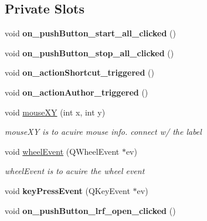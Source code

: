 \subsection*{Private Slots}
\begin{DoxyCompactItemize}
\item 
\hypertarget{class_main_window_a51927fde27346887663f8b1c8f83f5ab}{}void {\bfseries on\+\_\+push\+Button\+\_\+start\+\_\+all\+\_\+clicked} ()\label{class_main_window_a51927fde27346887663f8b1c8f83f5ab}

\item 
\hypertarget{class_main_window_a6b690c4d5c729e417ccc16fd730c452c}{}void {\bfseries on\+\_\+push\+Button\+\_\+stop\+\_\+all\+\_\+clicked} ()\label{class_main_window_a6b690c4d5c729e417ccc16fd730c452c}

\item 
\hypertarget{class_main_window_afbe2ceefce1abb0886094990582b988d}{}void {\bfseries on\+\_\+action\+Shortcut\+\_\+triggered} ()\label{class_main_window_afbe2ceefce1abb0886094990582b988d}

\item 
\hypertarget{class_main_window_a253e4560fc116df7949f20992ed0b734}{}void {\bfseries on\+\_\+action\+Author\+\_\+triggered} ()\label{class_main_window_a253e4560fc116df7949f20992ed0b734}

\item 
void \hyperlink{class_main_window_ae81612c12f590a4bc599332e71f52afc}{mouse\+X\+Y} (int x, int y)
\begin{DoxyCompactList}\small\item\em mouse\+X\+Y is to acuire mouse info. connect w/ the label \end{DoxyCompactList}\item 
void \hyperlink{class_main_window_ad6984d1fa1808b8406cbc30c5df26415}{wheel\+Event} (Q\+Wheel\+Event $\ast$ev)
\begin{DoxyCompactList}\small\item\em wheel\+Event is to acuire the wheel event \end{DoxyCompactList}\item 
\hypertarget{class_main_window_aa6d34cf000b53f621ecbee7bb9b4d5d2}{}void {\bfseries key\+Press\+Event} (Q\+Key\+Event $\ast$ev)\label{class_main_window_aa6d34cf000b53f621ecbee7bb9b4d5d2}

\item 
\hypertarget{class_main_window_a40746f5a56cdde34925b396fd8d67b89}{}void {\bfseries on\+\_\+push\+Button\+\_\+lrf\+\_\+open\+\_\+clicked} ()\label{class_main_window_a40746f5a56cdde34925b396fd8d67b89}


\end{DoxyCompactItemize}
